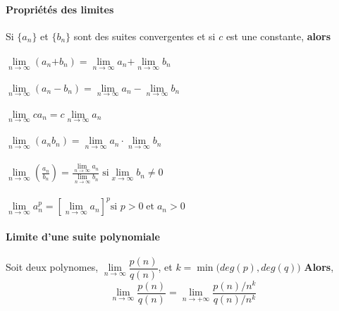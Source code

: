 \documentclass{report}
\begin{document}
\begin{multicols*}{3}
    \paragraph{Propriétés des limites}
        Si $\{a_n\}$ et $\{b_n\}$ sont des suites convergentes et 
        si $c$ est une constante, \textbf{alors} \\\\ 
        $\lim\limits_{n\to\infty  }\left(a_n \text{+} b_n \right) = 
        \lim\limits_{n\to\infty  }a_n \text{+} 
        \lim\limits_{n\to\infty  }b_n$
        \\\\
        $\lim\limits_{n\to\infty  }\left(a_n - b_n \right) = 
        \lim\limits_{n\to\infty  }a_n - \lim\limits_{n\to\infty  }b_n$ 
        \\\\
        $\lim\limits_{n\to\infty  }ca_n = c \lim\limits_{n \to \infty  }a_n$ 
        \\\\
        $\lim\limits_{n\to\infty  }\left(a_nb_n \right) = 
        \lim\limits_{n\to\infty  }a_n \cdot \lim\limits_{n\to\infty  }b_n$
        \\\\
        $\lim\limits_{n\to\infty  }\left(\frac{a_n}{b_n} \right) = 
        \frac{\lim\limits_{n\to\infty  }a_n}{\lim\limits_{n\to\infty  }b_n}
        \;
        \text{si} \lim\limits_{x\to\infty  }b_n \neq 0$
        \\\\
        $\lim\limits_{n\to\infty  }a_n^{p} = 
        \left[\lim\limits_{n\to\infty  }a_n \right]^p \text{si } 
        p > 0 \; \text{et} \; a_n > 0$



    \paragraph{Limite d'une suite polynomiale} 
        Soit deux polynomes,
        $\lim\limits_{n\to \infty } \dfrac{p(n)}{q(n)}$, 
        et 
        $k = \min\bigl(deg(p), deg(q)\bigr)$
        \textbf{Alors},   
        \[ \lim\limits_{n\to \infty } \dfrac{p(n)}{q(n)} =
        \lim\limits_{n\to+\infty}\dfrac{p(n)/{n^k}}{q(n)/n^{k}} \]




\end{multicols*}
\end{document}
